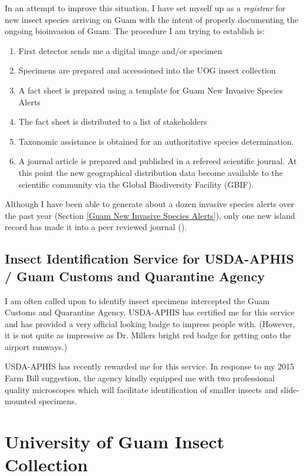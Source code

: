 \documentclass[12pt,oneside,english]{scrbook}
\begin{document}
In an attempt to improve this situation, I have set myself up as a \emph{registrar} for new insect species arriving on Guam with the intent of properly documenting the ongoing bioinvasion of Guam. The procedure I am trying to establish is:
\begin{enumerate}
\item First detector sends me a digital image and/or specimen
\item{Specimens are prepared and accessioned into the UOG insect collection}
\item{A fact sheet is prepared using a template for Guam New Invasive Species Alerts}
\item{The fact sheet is distributed to a list of stakeholders}
\item{Taxonomic assistance is obtained for an authoritative species determination.}
\item A journal article is prepared and published in a refereed scientific journal. At this point the new geographical distribution data become available to the scientific community via the Global Biodiversity Facility (GBIF).
\end{enumerate}

Although I have been able to generate about a dozen invasive species alerts over the past year (Section \ref{Guam New Invasive Species Alerts}), only one new island record has made it into a peer reviewed journal (\cite{Moore_Watson_Bamba_2014}).

\subsection{Insect Identification Service for USDA-APHIS / Guam Customs and Quarantine
Agency}

I am often called upon to identify insect specimens intercepted the
Guam Customs and Quarantine Agency. USDA-APHIS has certified me for
this service and has provided a very official looking badge to impress
people with. (However, it is not quite as impressive as Dr. Millers
bright red badge for getting onto the airport runways.) 

USDA-APHIS has recently rewarded me for this service. In response to
my 2015 Farm Bill suggestion, the agency kindly equipped me with two professional quality microscopes which will facilitate identification 
of smaller insects and slide-mounted specimens.

\section{University of Guam Insect Collection}
\end{document}
